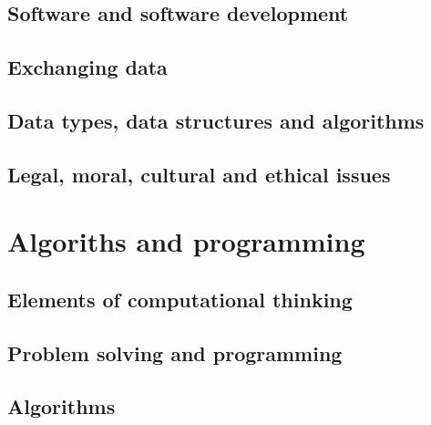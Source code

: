 \documentclass[a4paper]{report}
\begin{document}
\chapter{Software and software development}

\chapter{Exchanging data}

\chapter{Data types, data structures and algorithms}

\chapter{Legal, moral, cultural and ethical issues}

\part{Algoriths and programming}

\chapter{Elements of computational thinking}

\chapter{Problem solving and programming}

\chapter{Algorithms}
\end{document}
